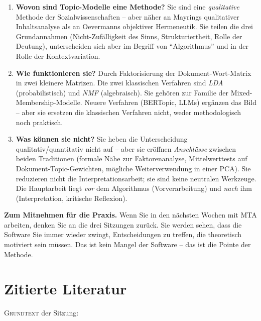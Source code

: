 \documentclass[a4paper,11pt]{article}
\begin{document}
\begin{enumerate}
\item \textbf{Wovon sind Topic-Modelle eine Methode?} Sie sind eine
\emph{qualitative} Methode der Sozialwissenschaften -- aber näher an
Mayrings qualitativer Inhaltsanalyse als an Oevermanns objektiver
Hermeneutik. Sie teilen die drei Grundannahmen (Nicht-Zufälligkeit
des Sinns, Strukturiertheit, Rolle der Deutung), unterscheiden sich
aber im Begriff von \enquote{Algorithmus} und in der Rolle der
Kontextvariation.

\item \textbf{Wie funktionieren sie?} Durch Faktorisierung der
Dokument-Wort-Matrix in zwei kleinere Matrizen. Die zwei klassischen
Verfahren sind \emph{LDA} (probabilistisch) und \emph{NMF}
(algebraisch). Sie gehören zur Familie der Mixed-Membership-Modelle.
Neuere Verfahren (BERTopic, LLMs) ergänzen das Bild -- aber sie
ersetzen die klassischen Verfahren nicht, weder methodologisch noch
praktisch.

\item \textbf{Was können sie nicht?} Sie heben die Unterscheidung
qualitativ/quantitativ nicht auf -- aber sie eröffnen
\emph{Anschlüsse} zwischen beiden Traditionen (formale Nähe zur
Faktorenanalyse, Mittelwerttests auf Dokument-Topic-Gewichten,
mögliche Weiterverwendung in einer PCA). Sie reduzieren nicht die
Interpretationsarbeit; sie sind keine neutralen Werkzeuge. Die
Hauptarbeit liegt \emph{vor} dem Algorithmus (Vorverarbeitung) und
\emph{nach} ihm (Interpretation, kritische Reflexion).
\end{enumerate}

\begin{merkbox}
\textbf{Zum Mitnehmen für die Praxis.} Wenn Sie in den nächsten Wochen
mit MTA arbeiten, denken Sie an die drei Sitzungen zurück. Sie werden
sehen, dass die Software Sie immer wieder zwingt, Entscheidungen zu
treffen, die theoretisch motiviert sein müssen. Das ist kein Mangel
der Software -- das ist die Pointe der Methode.
\end{merkbox}

\section*{Zitierte Literatur}

\footnotesize

\textsc{Grundtext} der Sitzung:
\end{document}
